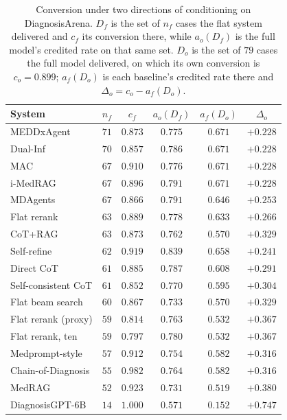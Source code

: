 \documentclass[letterpaper]{article}
\begin{document}
\begin{table}[tb]
\centering
\footnotesize
\setlength{\tabcolsep}{3pt}
\begin{tabular}{@{}lccccc@{}}
\toprule
System & $n_f$ & $c_f$ & $a_o(D_f)$ & $a_f(D_o)$ & $\Delta_o$ \\
\midrule
MEDDxAgent          & $71$ & $0.873$ & $0.775$ & $0.671$ & $+0.228$ \\
Dual-Inf            & $70$ & $0.857$ & $0.786$ & $0.671$ & $+0.228$ \\
MAC                 & $67$ & $0.910$ & $0.776$ & $0.671$ & $+0.228$ \\
i-MedRAG            & $67$ & $0.896$ & $0.791$ & $0.671$ & $+0.228$ \\
MDAgents            & $67$ & $0.866$ & $0.791$ & $0.646$ & $+0.253$ \\
Flat rerank         & $63$ & $0.889$ & $0.778$ & $0.633$ & $+0.266$ \\
CoT+RAG             & $63$ & $0.873$ & $0.762$ & $0.570$ & $+0.329$ \\
Self-refine         & $62$ & $0.919$ & $0.839$ & $0.658$ & $+0.241$ \\
Direct CoT          & $61$ & $0.885$ & $0.787$ & $0.608$ & $+0.291$ \\
Self-consistent CoT & $61$ & $0.852$ & $0.770$ & $0.595$ & $+0.304$ \\
Flat beam search    & $60$ & $0.867$ & $0.733$ & $0.570$ & $+0.329$ \\
Flat rerank (proxy) & $59$ & $0.814$ & $0.763$ & $0.532$ & $+0.367$ \\
Flat rerank, ten    & $59$ & $0.797$ & $0.780$ & $0.532$ & $+0.367$ \\
Medprompt-style     & $57$ & $0.912$ & $0.754$ & $0.582$ & $+0.316$ \\
Chain-of-Diagnosis  & $55$ & $0.982$ & $0.764$ & $0.582$ & $+0.316$ \\
MedRAG              & $52$ & $0.923$ & $0.731$ & $0.519$ & $+0.380$ \\
DiagnosisGPT-6B     & $14$ & $1.000$ & $0.571$ & $0.152$ & $+0.747$ \\
\bottomrule
\end{tabular}
\caption{Conversion under two directions of conditioning on DiagnosisArena. $D_f$ is the set of $n_f$ cases the flat system delivered and $c_f$ its conversion there, while $a_o(D_f)$ is the full model's credited rate on that same set. $D_o$ is the set of $79$ cases the full model delivered, on which its own conversion is $c_o = 0.899$; $a_f(D_o)$ is each baseline's credited rate there and $\Delta_o = c_o - a_f(D_o)$.}
\label{tab:conversion}
\end{table}
\end{document}
